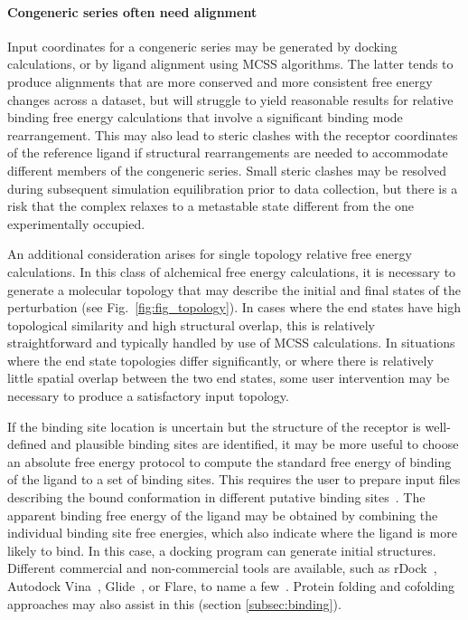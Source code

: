\documentclass[9pt,bestpractices]{livecoms}
\begin{document}
\paragraph{Congeneric series often need alignment}
Input coordinates for a congeneric series may be generated by docking calculations, or by ligand alignment using MCSS algorithms. The latter tends to produce alignments that are more conserved and more consistent free energy changes across a dataset, but will struggle to yield reasonable results for relative binding free energy calculations that involve a significant binding mode rearrangement. This may also lead to steric clashes with the receptor coordinates of the reference ligand if structural rearrangements are needed to accommodate different members of the congeneric series. Small steric clashes may be resolved during subsequent simulation equilibration prior to data collection, but there is a risk that the complex relaxes to a metastable state different from the one experimentally occupied. 

An additional consideration arises for single topology relative free energy calculations. In this class of alchemical free energy calculations, it is necessary to generate a molecular topology that may describe the initial and final states of the perturbation (see Fig.~\ref{fig:fig_topology}). In cases where the end states have high topological similarity and high structural overlap, this is relatively straightforward and typically handled by use of MCSS calculations. In situations where the end state topologies differ significantly, or where there is relatively little spatial overlap between the two end states, some user intervention may be necessary to produce a satisfactory input topology.

If the binding site location is uncertain but the structure of the receptor is well-defined and plausible binding sites are identified, it may be more useful to choose an absolute free energy protocol to compute the standard free energy of binding of the ligand to a set of binding sites. This requires the user to prepare input files describing the bound conformation in different putative binding sites~\cite{evoli2016multiple}. The apparent binding free energy of the ligand may be obtained by combining the individual binding site free energies, which also indicate where the ligand is more likely to bind. In this case, a docking program can generate initial structures. Different commercial and non-commercial tools are available, such as rDock~\cite{ruiz-carmona2014rdock}, Autodock Vina~\cite{trott2010autodock}, Glide~\cite{friesner2004glide}, or Flare, to name a few~\cite{kuhn2020assessment}. Protein folding and cofolding approaches may also assist in this (section \ref{subsec:binding}).
\end{document}
